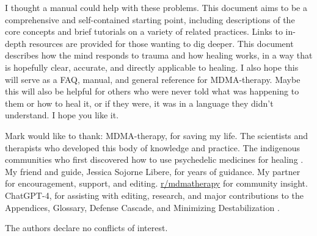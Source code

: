 \documentclass[12pt,letterpaper]{article}
\begin{document}
I thought a manual could help with these problems. This document aims to be a comprehensive and self-contained starting point, including descriptions of the core concepts and brief tutorials on a variety of related practices. Links to in-depth resources are provided for those wanting to dig deeper. This document describes how the mind responds to trauma and how healing works, in a way that is hopefully clear, accurate, and directly applicable to healing. I also hope this will serve as a FAQ, manual, and general reference for MDMA-therapy. Maybe this will also be helpful for others who were never told what was happening to them or how to heal it, or if they were, it was in a language they didn't understand. I hope you like it.

Mark would like to thank: MDMA-therapy, for saving my life. The scientists and therapists who developed this body of knowledge and practice. The indigenous communities who first discovered how to use psychedelic medicines for healing \cite{davisOneRiver}. My friend and guide, Jessica Sojorne Libere, for years of guidance. My partner for encouragement, support, and editing. \href{https://www.reddit.com/r/mdmatherapy}{r/mdmatherapy} for community insight. ChatGPT-4, for assisting with editing, research, and major contributions to the Appendices, Glossary, Defense Cascade, and Minimizing Destabilization \cite{openaiGPT}.

The authors declare no conflicts of interest.
\end{document}
